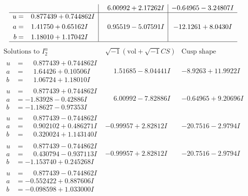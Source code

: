 \documentclass[1p]{elsarticle_modified}
\theoremstyle{definition}
\newcommand{\I}{\sqrt{-1}}
\begin{document}
$$\begin{array}{c|c|c}
 & \phantom{-}6.00992 + 2.17262 I & -0.64965 - 3.24807 I \\ \hline\begin{aligned}
u &= \phantom{-}0.877439 + 0.744862 I \\
a &= \phantom{-}1.41750 + 0.65162 I \\
b &= \phantom{-}1.18010 + 1.17042 I\end{aligned}
 & \phantom{-}0.95519 - 5.07591 I & -12.1261 + 8.0430 I\\
 \hline 
 \end{array}$$\newpage$$\begin{array}{c|c|c}  
\text{Solutions to }I^u_{2}& \I (\text{vol} + \sqrt{-1}CS) & \text{Cusp shape}\\
 \hline 
\begin{aligned}
u &= \phantom{-}0.877439 + 0.744862 I \\
a &= \phantom{-}1.64426 + 0.10506 I \\
b &= \phantom{-}1.06724 + 1.18010 I\end{aligned}
 & \phantom{-}1.51685 - 8.04441 I & -8.9263 + 11.9922 I \\ \hline\begin{aligned}
u &= \phantom{-}0.877439 + 0.744862 I \\
a &= -1.83928 - 0.42886 I \\
b &= -1.18627 - 0.97353 I\end{aligned}
 & \phantom{-}6.00992 - 7.82886 I & -0.64965 + 9.20696 I \\ \hline\begin{aligned}
u &= \phantom{-}0.877439 - 0.744862 I \\
a &= \phantom{-}0.902102 + 0.486271 I \\
b &= \phantom{-}0.320024 + 1.143140 I\end{aligned}
 & -0.99957 + 2.82812 I & -20.7516 - 2.9794 I \\ \hline\begin{aligned}
u &= \phantom{-}0.877439 - 0.744862 I \\
a &= \phantom{-}0.430794 - 0.937113 I \\
b &= -1.153740 + 0.245268 I\end{aligned}
 & -0.99957 + 2.82812 I & -20.7516 - 2.9794 I \\ \hline\begin{aligned}
u &= \phantom{-}0.877439 - 0.744862 I \\
a &= -0.552422 + 0.887606 I \\
b &= -0.098598 + 1.033000 I\end{aligned}

\end{array}$$
\end{document}
